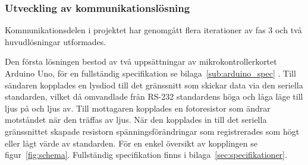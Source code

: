         \subsubsection{Utveckling av kommunikationslösning} %
        \label{ssub:utformning_av_kommunikationslosning}
            Kommunikationsdelen i projektet har genomgått flera iterationer av fas 3 och två huvudlösningar utformades.\bigskip 

            Den första lösningen bestod av två uppsättningar av mikrokontrollerkortet Arduino Uno, för en fullständig specifikation se bilaga~\ref{sub:arduino_spec} \cite{ardu}. Till sändaren kopplades en lysdiod till det gränssnitt som skickar data via den seriella standarden, vilket då omvandlade från RS-232 standardens höga och låga läge till ljus på och ljus av. Till mottagaren kopplades en fotoresistor som ändrar motståndet när den träffas av ljus. När den kopplades in till det seriella gränssnittet skapade resistorn spänningsförändringar som registrerades som högt eller lågt värde av standarden. För en enkel översikt av kopplingen se figur~\ref{fig:schema}. Fullständig specifikation finns i bilaga~\ref{sec:specifikationer}.\bigskip

